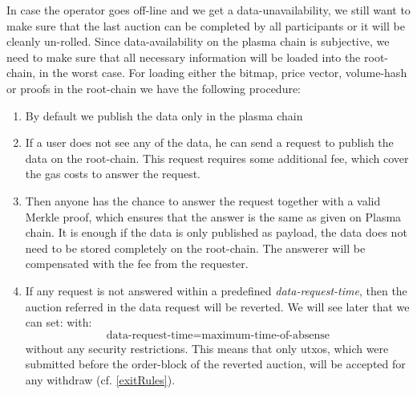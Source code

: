\documentclass[11pt,parskip=full]{scrartcl}%
\begin{document}
\label{enforceAvailablity}
In case the operator goes off-line and we get a data-unavailability, we still want to make sure that the last auction can be completed by all participants or it will be cleanly un-rolled. 
Since data-availability on the plasma chain is subjective, we need to make sure that all necessary information will be loaded into the root-chain, in the worst case. \newline
For loading either the bitmap, price vector, volume-hash or proofs in the root-chain we have the following procedure:
\begin{enumerate}
\item By default we publish the data only in the plasma chain
\item If a user does not see any of the data, he can send a request to publish the data on the root-chain. This request requires some additional fee, which cover the gas costs to answer the request.
\item Then anyone has the chance to answer the request together with a valid Merkle proof, which ensures that the answer is the same as given on Plasma chain. It is enough if the data is only published as payload, the data does not need to be stored completely on the root-chain. The answerer will be compensated with the fee from the requester.
\item If any request is not answered within a predefined \emph{data-request-time}, then the auction referred in the data request will be reverted. We will see later that we can set:
with: \begin{equation}
\text{data-request-time}=\text{maximum-time-of-absense}
\end{equation}
without any security restrictions.
This means that only utxos, which were submitted before the order-block of the reverted auction, will be accepted for any withdraw (cf. \ref{exitRules}). 
\end{enumerate}
\end{document}
